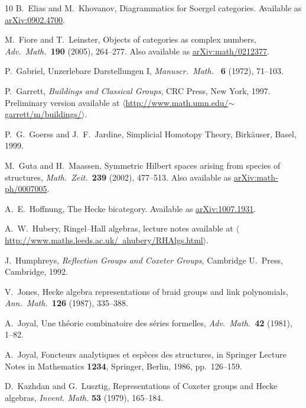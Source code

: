 \documentclass{article}
\begin{document}
\begin{thebibliography}{10}
B.\ Elias and M.\ Khovanov, Diagrammatics for Soergel categories.
Available as \href{http://arxiv.org/abs/0902.4700}{arXiv:0902.4700}.

M.\ Fiore and T.\ Leinster, Objects of categories as complex numbers,
{\sl Adv.\ Math.\ }{\bf 190} (2005), 264--277.  Also available as
\href{http://arxiv.org/abs/math/0212377}{arXiv:math/0212377}.

P.\ Gabriel, Unzerlebare Darstellungen I, \textit{Manuscr.\ Math.\ }
{\bf 6} (1972), 71--103.

 P.\ Garrett, {\sl Buildings and Classical Groups},
CRC Press, New York, 1997.   Preliminary version available at \hfill \break
\href{http://www.math.umn.edu/~garrett/m/buildings/}
{$\langle$http:/\!/www.math.umn.edu/$\sim$garrett/m/buildings/$\rangle$}.

P.\ G.\ Goerss and J.\ F.\ Jardine, Simplicial Homotopy Theory,
Birk\"auser, Basel, 1999.

 M.\ Guta and H.\ Maassen, Symmetric Hilbert spaces
arising from species of structures, {\sl Math.\ Zeit.\ }{\bf 239}
(2002), 477--513.  Also available as
\href{http://arxiv.org/abs/math-ph/0007005}
{arXiv:math-ph/0007005}.

 A.\ E.\ Hoffnung, The Hecke bicategory.  
Available as \href{http://arxiv.org/abs/1007.1931}{arXiv:1007.1931}.

 A.\ W.\ Hubery, Ringel--Hall algebras, lecture
notes available at
\href{http://www.maths.leeds.ac.uk/~ahubery/RHAlgs.html}
{$\langle$http:/\!/www.maths.leeds.ac.uk/~ahubery/RHAlgs.html$\rangle$}.

 J.\ Humphreys, {\sl Reflection Groups and
Coxeter Groups}, Cambridge U.\ Press, Cambridge, 1992.

 V.\ Jones, Hecke algebra representations of braid
groups and link polynomials, {\sl Ann.\ Math.\ }{\bf 126} (1987), 335--388.

 A.\ Joyal, Une th\'eorie combinatoire des s\'eries
formelles, {\sl Adv.\ Math.\ }{\bf 42} (1981), 1--82.

 A.\ Joyal, Foncteurs analytiques et esp\`eces des
structures, in Springer Lecture Notes in Mathematics {\bf 1234},
Springer, Berlin, 1986, pp.\ 126--159.

 D.\ Kazhdan and G.\ Lusztig, Representations of
Coxeter groups and Hecke algebras, \emph{Invent. Math.} {\bf 53} 
(1979), 165--184.


\end{thebibliography}
\end{document}

